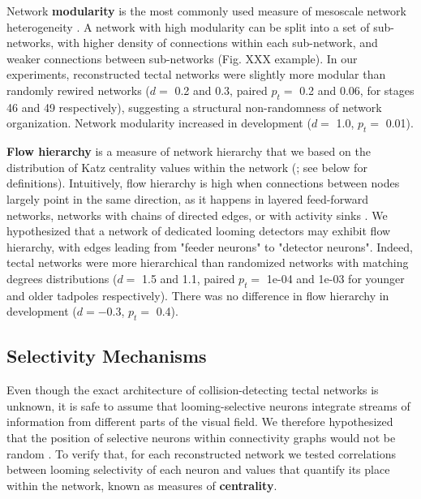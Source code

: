 \documentclass{article}
\begin{document}
Network \textbf{modularity} is the most commonly used measure of mesoscale network heterogeneity \citep{leicht2008community,newman2006modularity}. A network with high modularity can be split into a set of sub-networks, with higher density of connections within each sub-network, and weaker connections between sub-networks (Fig. XXX example). In our experiments, reconstructed tectal networks were slightly more modular than randomly rewired networks ($d=$ 0.2 and 0.3, paired $p_t=$ 0.2 and 0.06, for stages 46 and 49 respectively), suggesting a structural non-randomness of network organization. Network modularity increased in development ($d=$ 1.0, $p_t =$ 0.01).

\textbf{Flow hierarchy} is a measure of network hierarchy \citep{mones2012hierarchy} that we based on the distribution of Katz centrality values within the network (\citealt{katz1953original,fletcher2018katz}; see below for definitions). Intuitively, flow hierarchy is high when connections between nodes largely point in the same direction, as it happens in layered feed-forward networks, networks with chains of directed edges, or with activity sinks \citep{czegel2015hierarchy}. We hypothesized that a network of dedicated looming detectors may exhibit flow hierarchy, with edges leading from "feeder neurons" to "detector neurons". Indeed, tectal networks were more hierarchical than randomized networks with matching degrees distributions ($d=$ 1.5 and 1.1, paired $p_t=$ 1e-04 and 1e-03 for younger and older tadpoles respectively). There was no difference in flow hierarchy in development ($d=-$0.3, $p_t=$ 0.4).

\subsection*{Selectivity Mechanisms}

Even though the exact architecture of collision-detecting tectal networks is unknown, it is safe to assume that looming-selective neurons integrate streams of information from different parts of the visual field. We therefore hypothesized that the position of selective neurons within connectivity graphs would not be random \citep{timme2016degree}. To verify that, for each reconstructed network we tested correlations between looming selectivity of each neuron and values that quantify its place within the network, known as measures of \textbf{centrality}.
\end{document}
